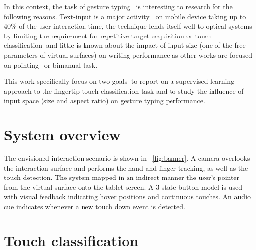 \documentclass{chi-ext}
\begin{document}
In this context, the task of gesture typing~\cite{Kristensson2004} is interesting to research for the following reasons. Text-input is a major activity~\cite{McGregor2014} on mobile device taking up to 40\% of the user interaction time, the technique lends itself well to optical systems by limiting the requirement for repetitive target acquisition or touch classification, and little is known about the impact of input size (one of the free parameters of virtual surfaces) on writing performance as other works are focused on pointing~\cite{Casiez2008,Gilliot2014} or bimanual task\cite{Schmidt2009}.

This work specifically focus on two goals: to report on a supervised learning approach to the fingertip touch classification task and to study the influence of input space (size and aspect ratio) on gesture typing performance.

\section{System overview}
The envisioned interaction scenario is shown in ~\autoref{fig:banner}. A camera overlooks the interaction surface and performs the hand and finger tracking, as well as the touch detection. The system mapped in an indirect manner the user's pointer from the virtual surface onto the tablet screen. A 3-state button model is used with visual feedback indicating hover positions and continuous touches. An audio cue indicates whenever a new touch down event is detected.

\section{Touch classification}

\end{document}
